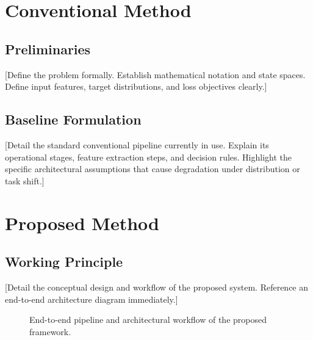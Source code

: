 \documentclass[a4paper,fleqn]{cas-sc}
\begin{document}
\section{Conventional Method}\label{sec:conventional}

\subsection{Preliminaries}
[Define the problem formally. Establish mathematical notation and state spaces. Define input features, target distributions, and loss objectives clearly.]

\subsection{Baseline Formulation}
[Detail the standard conventional pipeline currently in use. Explain its operational stages, feature extraction steps, and decision rules. Highlight the specific architectural assumptions that cause degradation under distribution or task shift.]

\section{Proposed Method}\label{sec:proposed}

\subsection{Working Principle}
[Detail the conceptual design and workflow of the proposed system. Reference an end-to-end architecture diagram immediately.]

\begin{figure}[t]
  \centering
  \caption{End-to-end pipeline and architectural workflow of the proposed framework.}
  \label{fig:pipeline}
\end{figure}
\end{document}
